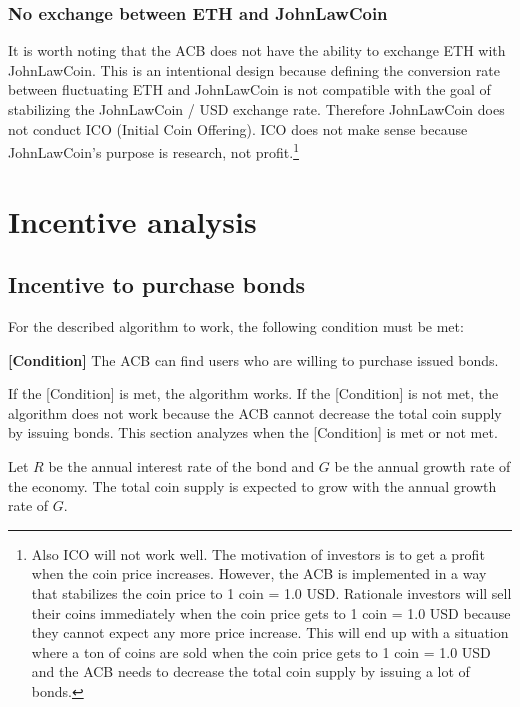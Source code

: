 \documentclass[dvipdfmx,a4paper]{article}
\begin{document}
\subsubsection{No exchange between ETH and JohnLawCoin}

It is worth noting that the ACB does not have the ability to exchange ETH with JohnLawCoin. This is an intentional design because defining the conversion rate between fluctuating ETH and JohnLawCoin is not compatible with the goal of stabilizing the JohnLawCoin / USD exchange rate. Therefore JohnLawCoin does not conduct ICO (Initial Coin Offering). ICO does not make sense because JohnLawCoin's purpose is research, not profit.\footnote{Also ICO will not work well. The motivation of investors is to get a profit when the coin price increases. However, the ACB is implemented in a way that stabilizes the coin price to 1 coin = 1.0 USD. Rationale investors will sell their coins immediately when the coin price gets to 1 coin = 1.0 USD because they cannot expect any more price increase. This will end up with a situation where a ton of coins are sold when the coin price gets to 1 coin = 1.0 USD and the ACB needs to decrease the total coin supply by issuing a lot of bonds.}

\section{Incentive analysis}

\subsection{Incentive to purchase bonds}

For the described algorithm to work, the following condition must be met:

\begin{description}
\item{\textbf{[Condition]}} The ACB can find users who are willing to purchase issued bonds.
\end{description}

If the [Condition] is met, the algorithm works. If the [Condition] is not met, the algorithm does not work because the ACB cannot decrease the total coin supply by issuing bonds. This section analyzes when the [Condition] is met or not met.

Let $R$ be the annual interest rate of the bond and $G$ be the annual growth rate of the economy. The total coin supply is expected to grow with the annual growth rate of $G$. 
\end{document}
